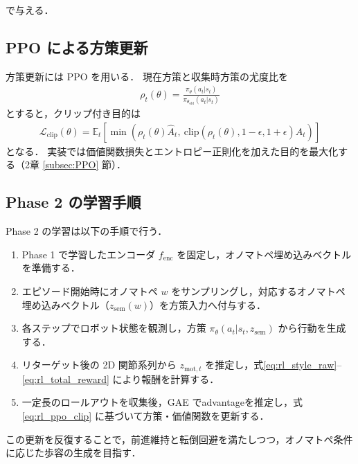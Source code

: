 で与える．

\subsection{PPO による方策更新}
\label{subsec:rl_ppo_update}

方策更新には PPO \cite{PPO} を用いる．
現在方策と収集時方策の尤度比を
\begin{align}
  \rho_t(\theta)=\frac{\pi_\theta(a_t|s_t)}{\pi_{\theta_{\mathrm{old}}}(a_t|s_t)}
\end{align}
とすると，クリップ付き目的は
\begin{align}
  \mathcal{L}_{\mathrm{clip}}(\theta)
  =
  \mathbb{E}_t\!\left[
  \min\!\left(
  \rho_t(\theta)\hat{A}_t,\ 
  \mathrm{clip}(\rho_t(\theta),1-\epsilon,1+\epsilon)\hat{A}_t
  \right)\right]
  \label{eq:rl_ppo_clip}
\end{align}
となる．
実装では価値関数損失とエントロピー正則化を加えた目的を最大化する（2章 \ref{subsec:PPO} 節）．

\subsection{Phase 2 の学習手順}
\label{subsec:rl_train_flow}

Phase 2 の学習は以下の手順で行う．
\begin{enumerate}
  \item Phase 1 で学習したエンコーダ $f_{\mathrm{enc}}$ を固定し，オノマトペ埋め込みベクトルを準備する．
  \item エピソード開始時にオノマトペ $w$ をサンプリングし，対応するオノマトペ埋め込みベクトル（$z_{\mathrm{sem}}(w)$）を方策入力へ付与する．
  \item 各ステップでロボット状態を観測し，方策 $\pi_\theta(a_t|s_t, z_{\mathrm{sem}})$ から行動を生成する．
  \item リターゲット後の 2D 関節系列から $z_{\mathrm{mot},t}$ を推定し，式\ref{eq:rl_style_raw}--\ref{eq:rl_total_reward} により報酬を計算する．
  \item 一定長のロールアウトを収集後，GAE でadvantageを推定し，式\ref{eq:rl_ppo_clip} に基づいて方策・価値関数を更新する．
\end{enumerate}

この更新を反復することで，前進維持と転倒回避を満たしつつ，オノマトペ条件に応じた歩容の生成を目指す．

